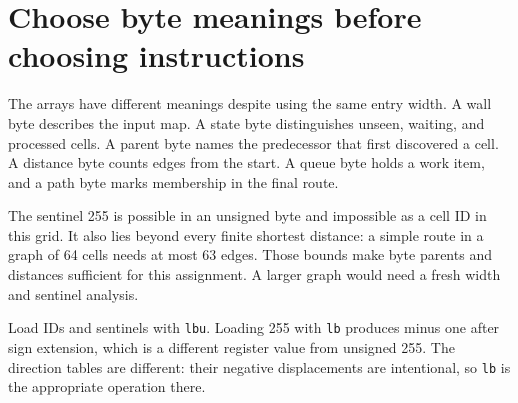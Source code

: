 \section{Choose byte meanings before choosing instructions}\label{maze-p02}

The arrays have different meanings despite using the same entry width. A wall byte describes the input map. A state byte distinguishes unseen, waiting, and processed cells. A parent byte names the predecessor that first discovered a cell. A distance byte counts edges from the start. A queue byte holds a work item, and a path byte marks membership in the final route.

The sentinel 255 is possible in an unsigned byte and impossible as a cell ID in this grid. It also lies beyond every finite shortest distance: a simple route in a graph of 64 cells needs at most 63 edges. Those bounds make byte parents and distances sufficient for this assignment. A larger graph would need a fresh width and sentinel analysis.

Load IDs and sentinels with \texttt{lbu}. Loading 255 with \texttt{lb} produces minus one after sign extension, which is a different register value from unsigned 255. The direction tables are different: their negative displacements are intentional, so \texttt{lb} is the appropriate operation there.
